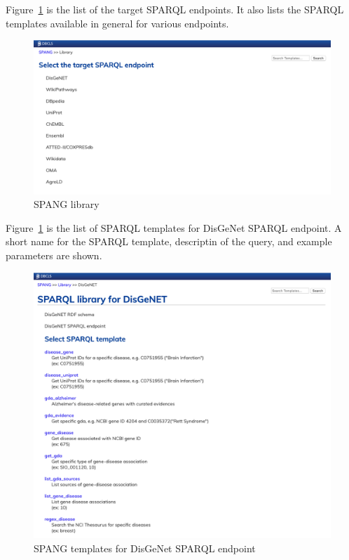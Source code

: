 \documentclass[runningheads]{llncs}
\begin{document}
Figure~\ref{fig:spang_lib} is the list of the target SPARQL endpoints. It also lists the SPARQL templates available in general for various endpoints.

\begin{figure}
\center
\includegraphics[width=1.0\textwidth]{spang_lib.png}
\caption{SPANG library}
\label{fig:spang_lib}
\end{figure}

Figure~\ref{fig:spang_lib} is the list of SPARQL templates for DisGeNet SPARQL endpoint.
A short name for the SPARQL template, descriptin of the query, and example parameters are shown.

\begin{figure}
\center
\includegraphics[width=1.0\textwidth]{spang_disgenet.png}
\caption{SPANG templates for DisGeNet SPARQL endpoint}
\label{fig:spang_disgenet}
\end{figure}
\end{document}
